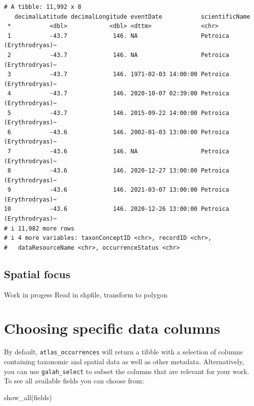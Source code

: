 \documentclass[
  letterpaper,
  DIV=11,
  numbers=noendperiod,
  oneside]{scrreprt}
\newenvironment{Shaded}{\begin{snugshade}}{\end{snugshade}}
\newcommand{\FunctionTok}[1]{\textcolor[rgb]{0.28,0.35,0.67}{#1}}
\newcommand{\NormalTok}[1]{\textcolor[rgb]{0.00,0.23,0.31}{#1}}
\begin{document}
\begin{verbatim}
# A tibble: 11,992 x 8
   decimalLatitude decimalLongitude eventDate           scientificName          
 *           <dbl>            <dbl> <dttm>              <chr>                   
 1           -43.7             146. NA                  Petroica (Erythrodryas)~
 2           -43.7             146. NA                  Petroica (Erythrodryas)~
 3           -43.7             146. 1971-02-03 14:00:00 Petroica (Erythrodryas)~
 4           -43.7             146. 2020-10-07 02:39:00 Petroica (Erythrodryas)~
 5           -43.7             146. 2015-09-22 14:00:00 Petroica (Erythrodryas)~
 6           -43.6             146. 2002-01-03 13:00:00 Petroica (Erythrodryas)~
 7           -43.6             146. NA                  Petroica (Erythrodryas)~
 8           -43.6             146. 2020-12-27 13:00:00 Petroica (Erythrodryas)~
 9           -43.6             146. 2021-03-07 13:00:00 Petroica (Erythrodryas)~
10           -43.6             146. 2020-12-26 13:00:00 Petroica (Erythrodryas)~
# i 11,982 more rows
# i 4 more variables: taxonConceptID <chr>, recordID <chr>,
#   dataResourceName <chr>, occurrenceStatus <chr>
\end{verbatim}

\hypertarget{spatial-focus}{%
\subsection{Spatial focus}\label{spatial-focus}}

Work in progess Read in shpfile, transform to polygon

\hypertarget{choosing-specific-data-columns}{%
\section{Choosing specific data
columns}\label{choosing-specific-data-columns}}

By default, \texttt{atlas\_occurrences} will return a tibble with a
selection of columns containing taxonomic and spatial data as well as
other metadata. Alternatively, you can use \texttt{galah\_select} to
subset the columns that are relevant for your work. To see all available
fields you can choose from:

\begin{Shaded}
\begin{Highlighting}[]
\FunctionTok{show\_all}\NormalTok{(fields) }
\end{Highlighting}
\end{Shaded}
\end{document}
